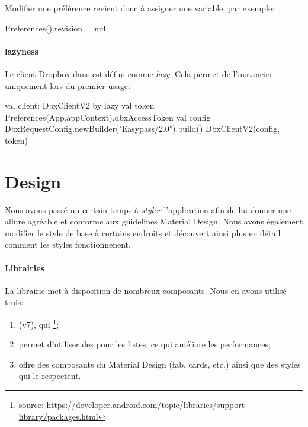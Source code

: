 Modifier une préférence revient donc à assigner une variable, par exemple:

\begin{kotlincode}
Preferences().revision = null
\end{kotlincode}

\paragraph*{lazyness} Le client Dropbox dans  est défini comme \emph{lazy}. Cela permet de l'instancier uniquement lors du premier usage:

\begin{kotlincode}
val client: DbxClientV2 by lazy {
    val token = Preferences(App.appContext).dbxAccessToken
    val config = DbxRequestConfig.newBuilder("Easypass/2.0").build()
    DbxClientV2(config, token)
}
\end{kotlincode}



\section{Design}

Nous avons passé un certain temps à \emph{styler} l'application afin de lui donner une allure agréable et conforme aux guidelines Material Design. Nous avons également modifier le style de base à certains endroits et découvert ainsi plus en détail comment les styles fonctionnenent.

\paragraph*{Librairies} La librairie  met à disposition de nombreux composants. Nous en avons utilisé trois:
\begin{enumerate}
    \item {} (v7), qui \footnote{source: \url{https://developer.android.com/topic/libraries/support-library/packages.html}};
    \item {} permet d'utiliser des  pour les listes, ce qui améliore les performances;
    \item {} offre des composants du Material Design (fab, cards, etc.) ainsi que des styles qui le respectent.
\end{enumerate}

